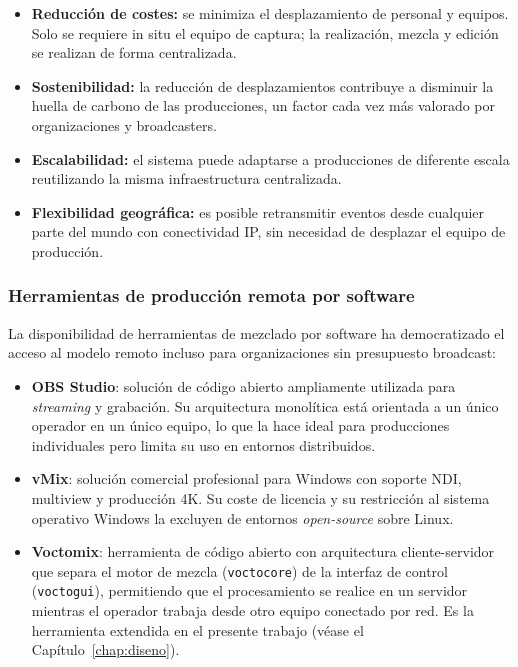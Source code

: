 \begin{itemize}
  \item \textbf{Reducción de costes:} se minimiza el desplazamiento de personal y
  equipos. Solo se requiere in situ el equipo de captura; la realización, mezcla y
  edición se realizan de forma centralizada.
  \item \textbf{Sostenibilidad:} la reducción de desplazamientos contribuye a disminuir
  la huella de carbono de las producciones, un factor cada vez más valorado por
  organizaciones y broadcasters.
  \item \textbf{Escalabilidad:} el sistema puede adaptarse a producciones de diferente
  escala reutilizando la misma infraestructura centralizada.
  \item \textbf{Flexibilidad geográfica:} es posible retransmitir eventos desde
  cualquier parte del mundo con conectividad IP, sin necesidad de desplazar el equipo
  de producción.
\end{itemize}

\subsubsection*{Herramientas de producción remota por software}

La disponibilidad de herramientas de mezclado por software ha democratizado el acceso
al modelo remoto incluso para organizaciones sin presupuesto broadcast:

\begin{itemize}
  \item \textbf{OBS Studio}: solución de código abierto ampliamente utilizada para
  \textit{streaming} y grabación. Su arquitectura monolítica está orientada a un único
  operador en un único equipo, lo que la hace ideal para producciones individuales pero
  limita su uso en entornos distribuidos.
  \item \textbf{vMix}: solución comercial profesional para Windows con soporte NDI,
  multiview y producción 4K. Su coste de licencia y su restricción al sistema operativo
  Windows la excluyen de entornos \textit{open-source} sobre Linux.
  \item \textbf{Voctomix}: herramienta de código abierto con arquitectura
  cliente-servidor que separa el motor de mezcla (\texttt{voctocore}) de la interfaz
  de control (\texttt{voctogui}), permitiendo que el procesamiento se realice en un
  servidor mientras el operador trabaja desde otro equipo conectado por red. Es la
  herramienta extendida en el presente trabajo (véase el
  Capítulo~\ref{chap:diseno}).
\end{itemize}

